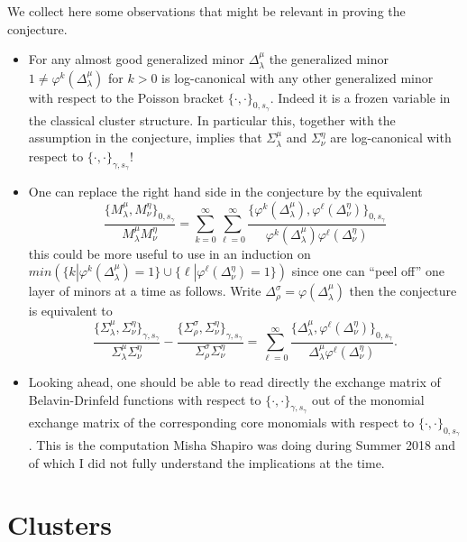 \documentclass[a4paper]{amsart}
\theoremstyle{definition}
\begin{document}
We collect here some observations that might be relevant in proving the conjecture.
\begin{itemize}
  \item
   For any almost good generalized minor $\Delta_\lambda^\mu$ the generalized minor $1\neq\varphi^k(\Delta_\lambda^\mu)$ for $k>0$ is log-canonical with any other generalized minor with respect to the Poisson bracket $\{\cdot,\cdot\}_{0,s_\gamma}$.
   Indeed it is a frozen variable in the classical cluster structure.
   In particular this, together with the assumption in the conjecture, implies that $\Sigma_\lambda^\mu$ and $\Sigma_\nu^\eta$ are log-canonical with respect to $\{\cdot,\cdot\}_{\gamma,s_\gamma}$!

 \item
   One can replace the right hand side in the conjecture by the equivalent
   \[
     \frac{\{M_\lambda^\mu,M_\nu^\eta\}_{0,s_\gamma}}{M_\lambda^\mu M_\nu^\eta}
     =
     \sum_{k=0}^\infty\sum_{\ell=0}^\infty \frac{\{\varphi^k(\Delta_\lambda^\mu),\varphi^\ell(\Delta_\nu^\eta)\}_{0,s_\gamma}}{\varphi^k(\Delta_\lambda^\mu)\varphi^\ell(\Delta_\nu^\eta)}
   \]
   this could be more useful to use in an induction on $min(\{k | \varphi^k(\Delta_\lambda^\mu)=1\}\cup \{\ell | \varphi^\ell(\Delta_\nu^\eta)=1\} )$ since one can ``peel off'' one layer of minors at a time as follows.
   Write $\Delta_\rho^\sigma = \varphi(\Delta_\lambda^\mu)$ then the conjecture is equivalent to
   \[
     \frac{\{\Sigma_\lambda^\mu,\Sigma_\nu^\eta\}_{\gamma,s_\gamma}}{\Sigma_\lambda^\mu \Sigma_\nu^\eta}
     -
     \frac{\{\Sigma_\rho^\sigma,\Sigma_\nu^\eta\}_{\gamma,s_\gamma}}{\Sigma_\rho^\sigma \Sigma_\nu^\eta}
     =
     \sum_{\ell=0}^\infty \frac{\{\Delta_\lambda^\mu,\varphi^\ell(\Delta_\nu^\eta)\}_{0,s_\gamma}}{\Delta_\lambda^\mu\varphi^\ell(\Delta_\nu^\eta)}
     .
   \]

 \item
   Looking ahead, one should be able to read directly the exchange matrix of Belavin-Drinfeld functions with respect to $\{\cdot,\cdot\}_{\gamma,s_\gamma}$ out of the monomial exchange matrix of the corresponding core monomials with respect to $\{\cdot,\cdot\}_{0,s_\gamma}$.
   This is the computation Misha Shapiro was doing during Summer 2018 and of which I did not fully understand the implications at the time.
\end{itemize}

\section{Clusters}
\end{document}
